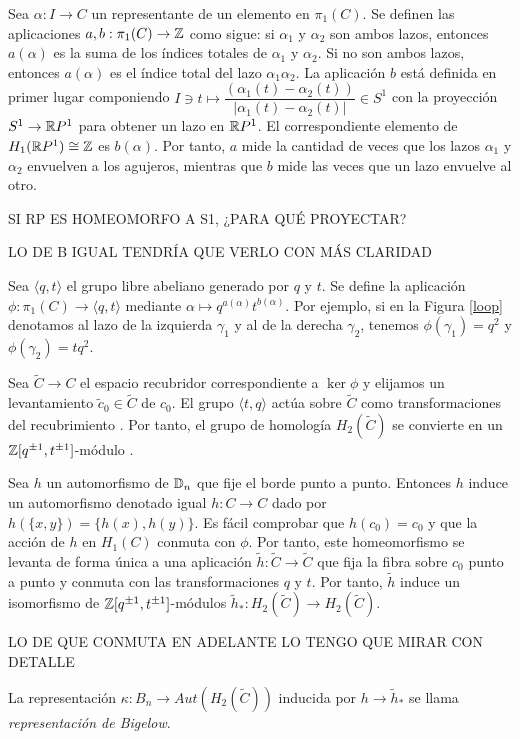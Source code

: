 \documentclass[TFG.tex]{subfiles}
\begin{document}
Sea $\alpha:I\to C$ un representante de un elemento en $\pi_1(C)$. Se definen las aplicaciones $a,b:\pi_1(C)\to\mathbb{Z}$ como sigue: si $\alpha_1$ y $\alpha_2$ son ambos lazos, entonces $a(\alpha)$ es la suma de los índices totales de $\alpha_1$ y $\alpha_2$. Si no son ambos lazos, entonces $a(\alpha)$ es el índice total del lazo $\alpha_1\alpha_2$. La aplicación $b$ está definida en primer lugar componiendo $I\ni t\mapsto \dfrac{(\alpha_1(t)-\alpha_2(t))}{|\alpha_1(t)-\alpha_2(t)|}\in S^1$ con la proyección $S^1\to \mathbb{R} P^1$ para obtener un lazo en $\mathbb{R} P^1$. El correspondiente elemento de $H_1(\mathbb{R} P^1)\cong\mathbb{Z}$ es $b(\alpha)$. Por tanto, $a$ mide la cantidad de veces que los lazos $\alpha_1$ y $\alpha_2$ envuelven a los agujeros, mientras que $b$ mide las veces que un lazo envuelve al otro.

SI RP ES HOMEOMORFO A S1, ¿PARA QUÉ PROYECTAR? 

LO DE B IGUAL TENDRÍA QUE VERLO CON MÁS CLARIDAD

Sea $\langle q,t\rangle$ el grupo libre abeliano  generado por $q$ y $t$. Se define la aplicación $\phi:\pi_1(C)\to\langle q,t\rangle$ mediante $\alpha\mapsto q^{a(\alpha)}t^{b(\alpha)}$. Por ejemplo, si en la Figura \ref{loop} denotamos al lazo de la izquierda $\gamma_1$ y al de la derecha $\gamma_2$, tenemos $\phi(\gamma_1)=q^2$ y $\phi(\gamma_2)=tq^2$. 

Sea $\tilde{C}\to C$ el espacio recubridor correspondiente a $\ker\phi$ y elijamos un levantamiento $\tilde{c}_0\in\tilde{C}$ de $c_0$. El grupo $\langle t,q\rangle$ actúa sobre $\tilde{C}$ como transformaciones del recubrimiento \cite{thesis}. Por tanto, el grupo de homología $H_2(\tilde{C})$ se convierte en un $\mathbb{Z}[q^{\pm 1},t^{\pm 1}]$-módulo \cite{nundam}.

Sea $h$ un automorfismo de $\mathbb{D}_n$ que fije el borde punto a punto. Entonces $h$ induce un automorfismo denotado igual $h:C\to C$ dado por $h(\{x,y\})=\{h(x),h(y)\}$. Es fácil comprobar que $h(c_0)=c_0$ y que la acción de $h$ en $H_1(C)$ conmuta con $\phi$. Por tanto, este homeomorfismo se levanta de forma única a una aplicación $\tilde{h}:\tilde{C}\to\tilde{C}$ que fija la fibra sobre $c_0$ punto a punto y conmuta con las transformaciones $q$ y $t$. Por tanto, $\tilde{h}$ induce un isomorfismo de $\mathbb{Z}[q^{\pm 1},t^{\pm 1}]$-módulos $\tilde{h}_*:H_2(\tilde{C})\to H_2(\tilde{C})$.

LO DE QUE CONMUTA EN ADELANTE LO TENGO QUE MIRAR CON DETALLE

\begin{defi}
La representación $\kappa:B_n\to Aut(H_2(\tilde{C}))$ inducida por $h\to\tilde{h}_*$ se llama \emph{representación de Bigelow}.
\end{defi}
\end{document}

